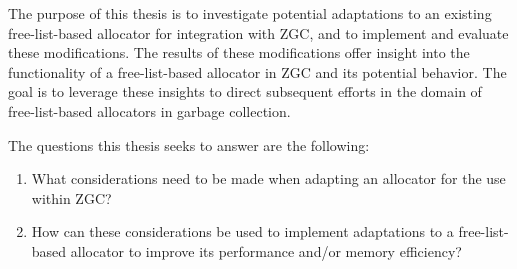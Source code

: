 The purpose of this thesis is to investigate potential adaptations to an existing free-list-based allocator for integration with ZGC, and to implement and evaluate these modifications. The results of these modifications offer insight into the functionality of a free-list-based allocator in ZGC and its potential behavior. The goal is to leverage these insights to direct subsequent efforts in the domain of free-list-based allocators in garbage collection.

The questions this thesis seeks to answer are the following:
\begin{enumerate}
  \item What considerations need to be made when adapting an allocator for the use within ZGC?
  \item How can these considerations be used to implement adaptations to a free-list-based allocator to improve its performance and/or memory efficiency?
\end{enumerate}

